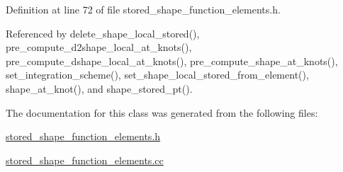 Definition at line 72 of file stored\+\_\+shape\+\_\+function\+\_\+elements.\+h.



Referenced by delete\+\_\+shape\+\_\+local\+\_\+stored(), pre\+\_\+compute\+\_\+d2shape\+\_\+local\+\_\+at\+\_\+knots(), pre\+\_\+compute\+\_\+dshape\+\_\+local\+\_\+at\+\_\+knots(), pre\+\_\+compute\+\_\+shape\+\_\+at\+\_\+knots(), set\+\_\+integration\+\_\+scheme(), set\+\_\+shape\+\_\+local\+\_\+stored\+\_\+from\+\_\+element(), shape\+\_\+at\+\_\+knot(), and shape\+\_\+stored\+\_\+pt().



The documentation for this class was generated from the following files\+:\begin{DoxyCompactItemize}
\item 
\hyperlink{stored__shape__function__elements_8h}{stored\+\_\+shape\+\_\+function\+\_\+elements.\+h}\item 
\hyperlink{stored__shape__function__elements_8cc}{stored\+\_\+shape\+\_\+function\+\_\+elements.\+cc}\end{DoxyCompactItemize}
